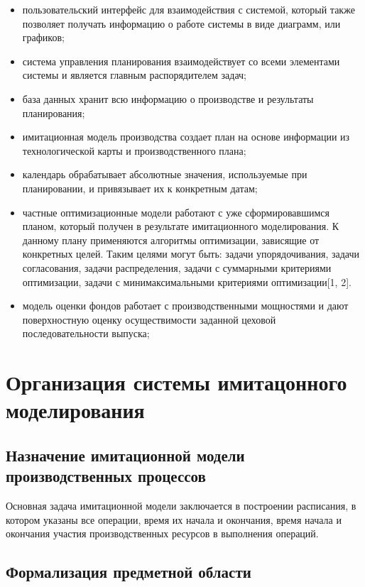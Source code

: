 \begin{itemize}
    \item пользовательский интерфейс для взаимодействия с системой, который также позволяет получать информацию о работе системы в виде диаграмм, или графиков; 
    \item система управления планирования взаимодействует со всеми элементами системы и является главным распорядителем задач;
    \item база данных хранит всю информацию о производстве и результаты планирования; 
    \item имитационная модель производства создает план на основе информации из технологической карты и производственного плана;
    \item календарь обрабатывает абсолютные значения, используемые при планировании, и привязывает их к конкретным датам;
    \item частные оптимизационные модели работают с уже сформировавшимся планом, который получен в результате имитационного моделирования. К данному плану применяются алгоритмы оптимизации, зависящие от конкретных целей. Таким целями могут быть: задачи упорядочивания, задачи согласования, задачи распределения, задачи с суммарными критериями оптимизации, задачи с минимаксимальными критериями оптимизации[1, 2].
    \item модель оценки фондов работает с производственными мощностями и дают поверхностную оценку осуществимости заданной цеховой последовательности выпуска;
\end{itemize}

\section{Организация системы имитацонного моделирования}

\subsection{Назначение имитационной модели производственных процессов}

Основная задача имитационной модели заключается в построении расписания, в котором указаны все операции, время их начала и окончания, время начала и окончания участия производственных ресурсов в выполнения операций.

\subsection{Формализация предметной области}

